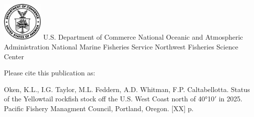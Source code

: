 \documentclass[
]{scrartcl}
\renewcommand*\contentsname{Table of contents}
\newcommand\contentsname{Table of contents}
\begin{document}
\begin{titlepage}
\begin{minipage}[b][\textheight][s]{\textwidth}
  \vspace{1\baselineskip}



  \vfill


  \vspace{1\baselineskip}

  \includegraphics[alt={},width=2cm]{support_files/us_doc_logo.png}\newline %
  U.S. Department of Commerce\newline
  National Oceanic and Atmospheric Administration\newline
  National Marine Fisheries Service\newline
  Northwest Fisheries Science Center\newline

  \end{minipage}
  \restoregeometry
  \end{titlepage}
\ifdefined\Shaded\renewenvironment{Shaded}{\begin{tcolorbox}[frame hidden, enhanced, sharp corners, borderline west={3pt}{0pt}{shadecolor}, interior hidden, boxrule=0pt, breakable]}{\end{tcolorbox}}\fi

\renewcommand*\contentsname{Table of contents}
{
\hypersetup{linkcolor=}
\setcounter{tocdepth}{3}
\tableofcontents
}
\setcounter{page}{1}

\renewcommand{\thetable}{\roman{table}}
\renewcommand{\thefigure}{\roman{figure}}

\newpage{}

Please cite this publication as:

Oken, K.L., I.G. Taylor, M.L. Feddern, A.D. Whitman, F.P. Caltabellotta.
Status of the Yellowtail rockfish stock off the U.S. West Coast north of
40°10\(\prime\) in 2025. Pacific Fishery Managment Council, Portland,
Oregon. {[}XX{]} p.
\end{document}
